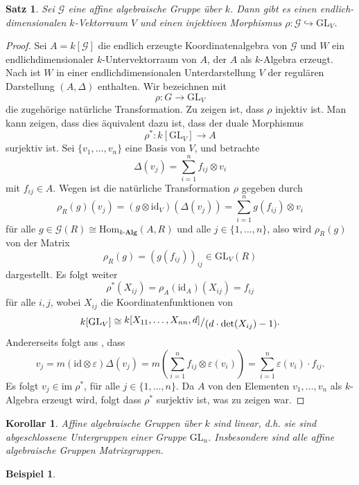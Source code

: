 \documentclass[a4paper, 11pt]{scrartcl}
\newcommand{\ringquot}[2]{{\raisebox{.2em}{\(#1\)}/\raisebox{-.2em}{\(#2\)}}}
\newcommand{\Hom}{\text{Hom}}
\newcommand{\id}{\text{id}}
\theoremstyle{basicstyle}
\newtheorem{beispiel}[definition]{Beispiel}
\newtheorem{korollar}[definition]{Korollar}
\newtheorem{satz}[definition]{Satz}
\begin{document}
    \begin{satz}
        Sei \(\mathcal{G}\) eine affine algebraische Gruppe über \(k\).
        Dann gibt es einen endlich-dimensionalen \(k\)-Vektorraum \(V\) und einen injektiven Morphismus \(\rho: \mathcal{G} \hookrightarrow \text{GL}_V\).
    \end{satz}
    \begin{proof}
        Sei \(A = k[\mathcal{G}]\) die endlich erzeugte Koordinatenalgebra von \(\mathcal{G}\) und \(W\) ein endlichdimensionaler \(k\)-Untervektorraum von \(A\), der \(A\) als \(k\)-Algebra erzeugt.
        Nach  ist \(W\) in einer endlichdimensionalen Unterdarstellung \(V\) der regulären Darstellung \((A, \Delta)\) enthalten.
        Wir bezeichnen mit 
        \[\rho: G \longrightarrow \text{GL}_V\]
        die zugehörige natürliche Transformation.
        Zu zeigen ist, dass \(\rho\) injektiv ist.
        Man kann zeigen, dass dies äquivalent dazu ist, dass der duale Morphismus
        \[\rho^\ast: k[\text{GL}_V] \longrightarrow A\]
        surjektiv ist.
        Sei \(\{v_1, \ldots, v_n\}\) eine Basis von \(V\), und betrachte
        \[\Delta(v_j) = \sum_{i=1}^{n} f_{ij} \otimes v_i\]
        mit \(f_{ij} \in A\).
        Wegen  ist die natürliche Transformation \(\rho\) gegeben durch
        \[\rho_R(g)(v_j) = (g \otimes \id_V)(\Delta(v_j)) = \sum_{i=1}^{n} g(f_{ij}) \otimes v_i\]
        für alle \(g \in \mathcal{G}(R) \cong \Hom_{k\textbf{-Alg}}(A, R)\) und alle \(j \in \{1, \ldots, n\}\), also wird \(\rho_R(g)\) von der Matrix
        \[\rho_R(g) = (g(f_{ij}))_{ij} \in \text{GL}_V(R)\]
        dargestellt.
        Es folgt weiter
        \[\rho^\ast(X_{ij}) = \rho_A(\id_A)(X_{ij}) = f_{ij}\]
        für alle \(i,j\), wobei \(X_{ij}\) die Koordinatenfunktionen von 
        \[k[\text{GL}_V] \cong \ringquot{k[X_{11}, \ldots, X_{nn}, d]}{(d\cdot \det(X_{ij}) - 1)}.\]
        Andererseits folgt aus , dass
        \[v_j = m(\id \otimes \varepsilon)\Delta(v_j) = m \left( \sum_{i=1}^{n} f_{ij} \otimes \varepsilon(v_i) \right) = \sum_{i=1}^{n} \varepsilon(v_i) \cdot f_{ij}.\]
        Es folgt \(v_j \in \text{im} \; \rho^\ast\), für alle \(j \in \{1, \ldots, n\}\).
        Da \(A\) von den Elementen \(v_1, \ldots, v_n\) als \(k\)-Algebra erzeugt wird, folgt dass \(\rho^\ast\) surjektiv ist, was zu zeigen war.
    \end{proof}

    \begin{korollar}
        Affine algebraische Gruppen über \(k\) sind linear, d.h. sie sind abgeschlossene Untergruppen einer Gruppe \(\text{GL}_n\).
        Insbesondere sind alle affine algebraische Gruppen Matrixgruppen.
    \end{korollar}

    \begin{beispiel}
        
    \end{beispiel}
\end{document}
